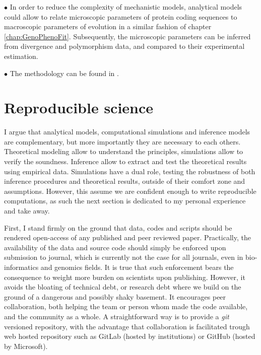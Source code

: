 $\bullet$ In order to reduce the complexity of mechanistic models, analytical models could allow to relate microscopic parameters of protein coding sequences to macroscopic parameters of evolution in a similar fashion of chapter \ref{chap:GenoPhenoFit}.
Subsequently, the microscopic parameters can be inferred from divergence and polymorphism data, and compared to their experimental estimation.

$\bullet$ The methodology can be found in \citet{Brevet2019}.

\section{Reproducible science}
\label{sec:reproducible-science}

I argue that analytical models, computational simulations and inference models are complementary, but more importantly they are necessary to each others.
Theoretical modeling allow to understand the principles, simulations allow to verify the soundness.
Inference allow to extract and test the theoretical results using empirical data.
Simulations have a dual role, testing the robustness of both inference procedures and theoretical results, outside of their comfort zone and assumptions.
However, this assume we are confident enough to write reproducible computations, as such the next section is dedicated to my personal experience and take away.

First, I stand firmly on the ground that data, codes and scripts should be rendered open-access of any published and peer reviewed paper.
Practically, the availability of the data and source code should simply be enforced upon submission to journal, which is currently not the case for all journals, even in bio-informatics and genomics fields.
It is true that such enforcement bears the consequence to weight more burden on scientists upon publishing.
However, it avoids the bloating of technical debt, or research debt where we build on the ground of a dangerous and possibly shaky basement.
It encourages peer collaboration, both helping the team or person whom made the code available, and the community as a whole.
A straightforward way is to provide a \textit{git} versioned repository, with the advantage that collaboration is facilitated trough web hosted repository such as GitLab (hosted by institutions) or GitHub (hosted by Microsoft).

